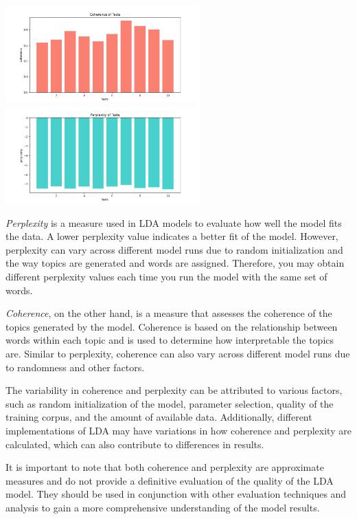 \documentclass[10pt]{article} %
\begin{document}
		
	\begin{center}
		\includegraphics[width=7.5cm]{images/coherence_stopwords}
		\includegraphics[width=7.5cm]{images/perplexity_stopwords}
	\end{center}

	\textit{Perplexity} is a measure used in LDA models to evaluate how well the model fits the data. A lower perplexity value indicates a better fit of the model. However, perplexity can vary across different model runs due to random initialization and the way topics are generated and words are assigned. Therefore, you may obtain different perplexity values each time you run the model with the same set of words.
	
	\textit{Coherence}, on the other hand, is a measure that assesses the coherence of the topics generated by the model. Coherence is based on the relationship between words within each topic and is used to determine how interpretable the topics are. Similar to perplexity, coherence can also vary across different model runs due to randomness and other factors.
	
	The variability in coherence and perplexity can be attributed to various factors, such as random initialization of the model, parameter selection, quality of the training corpus, and the amount of available data. Additionally, different implementations of LDA may have variations in how coherence and perplexity are calculated, which can also contribute to differences in results.
	
	It is important to note that both coherence and perplexity are approximate measures and do not provide a definitive evaluation of the quality of the LDA model. They should be used in conjunction with other evaluation techniques and analysis to gain a more comprehensive understanding of the model results.
	
\end{document}
